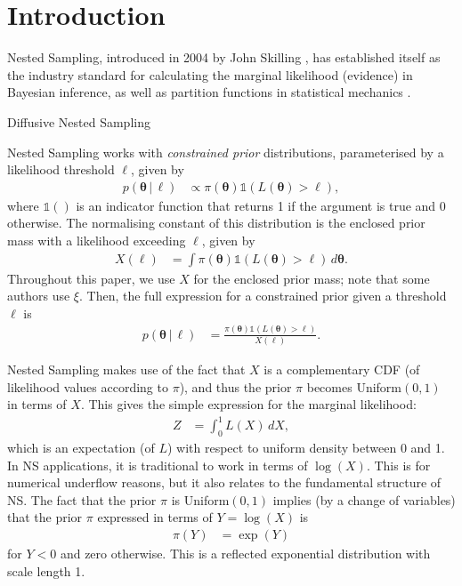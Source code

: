 \documentclass[entropy,article,submit,pdftex,moreauthors]{Definitions/mdpi}
\newcommand{\thresh}{\ell}
\newcommand{\coord}{\boldsymbol{\theta}}
\newcommand{\given}{\,|\,}
\begin{document}






\section{Introduction}
Nested Sampling, introduced in 2004 by John Skilling
\citep{skilling2004nested, skilling2006nested}, has established itself
as the industry standard for calculating the marginal likelihood (evidence)
in Bayesian inference, as well as partition functions in statistical
mechanics \citep{ashton2022nested, buchner2023nested}.

Diffusive Nested Sampling
\citep{dns}


Nested Sampling works with {\em constrained prior} distributions,
parameterised by a likelihood threshold $\thresh$, given by
\begin{align}
p(\coord \given \thresh)
    &\propto \pi(\coord)\mathds{1}\left(L(\coord) > \thresh\right),
\end{align}
where $\mathds{1}()$ is an indicator function that returns 1 if the argument
is true and 0 otherwise.
The normalising constant of this distribution is the enclosed prior
mass with a likelihood exceeding $\thresh$, given by
\begin{align}
X(\thresh) &= \int \pi(\coord)
                \mathds{1}\left(L(\coord) > \thresh\right) \, d\coord.
\end{align}
Throughout this paper, we use $X$ for the enclosed prior mass; note that some
authors use $\xi$. Then, the full expression for a constrained prior
given a threshold $\thresh$ is
\begin{align}
p(\coord \given \thresh)
    &= \frac{\pi(\coord)\mathds{1}\left(L(\coord) > \thresh\right)}{X(\thresh)}.
\end{align}

Nested Sampling makes use of the fact that $X$ is a complementary CDF
(of likelihood values according to $\pi$), and thus the prior $\pi$
becomes Uniform$(0, 1)$ in terms of $X$. This gives the simple expression
for the marginal likelihood:
\begin{align}
Z &= \int_0^1 L(X) \, dX,
\end{align}
which is an expectation (of $L$) with respect to uniform density between
0 and 1.
In NS applications, it is traditional to work in terms of $\log(X)$.
This is for numerical underflow reasons, but it also relates to the fundamental
structure of NS.
The fact that the prior $\pi$ is Uniform$(0, 1)$ implies
(by a change of variables) that the
prior $\pi$ expressed in terms of $Y = \log(X)$ is
\begin{align}
\pi(Y) &= \exp(Y)
\end{align}
for $Y < 0$ and zero otherwise. This is a reflected exponential distribution
with scale length 1.
\end{document}
